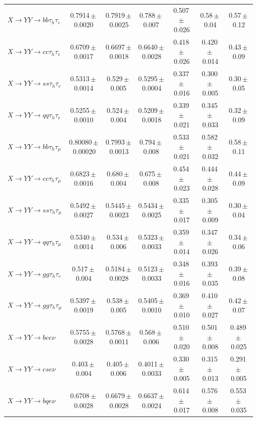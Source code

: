 \begin{landscape}
{\begin{longtable}{@{\extracolsep{\fill}}lcccccc@{}}
$X\to YY\to bb\tau_h\tau_e$ & 0.7914\,$\pm$\,0.0020 & 0.7919\,$\pm$\,0.0025 & 0.788\,$\pm$\,0.007 & 0.507\,$\pm$\,0.026 & 0.58\,$\pm$\,0.04 & 0.57\,$\pm$\,0.12 \\
$X\to YY\to cc\tau_h\tau_e$ & 0.6709\,$\pm$\,0.0017 & 0.6697\,$\pm$\,0.0018 & 0.6640\,$\pm$\,0.0028 & 0.418\,$\pm$\,0.026 & 0.420\,$\pm$\,0.014 & 0.43\,$\pm$\,0.09 \\
$X\to YY\to ss\tau_h\tau_e$ & 0.5313\,$\pm$\,0.0014 & 0.529\,$\pm$\,0.005 & 0.5295\,$\pm$\,0.0004 & 0.337\,$\pm$\,0.016 & 0.300\,$\pm$\,0.005 & 0.30\,$\pm$\,0.05 \\
$X\to YY\to qq\tau_h\tau_e$ & 0.5255\,$\pm$\,0.0010 & 0.524\,$\pm$\,0.004 & 0.5209\,$\pm$\,0.0018 & 0.339\,$\pm$\,0.021 & 0.345\,$\pm$\,0.033 & 0.32\,$\pm$\,0.09 \\
$X\to YY\to bb\tau_h\tau_\mu$ & 0.80080\,$\pm$\,0.00020 & 0.7993\,$\pm$\,0.0013 & 0.794\,$\pm$\,0.008 & 0.533\,$\pm$\,0.021 & 0.582\,$\pm$\,0.032 & 0.58\,$\pm$\,0.11 \\
$X\to YY\to cc\tau_h\tau_\mu$ & 0.6823\,$\pm$\,0.0016 & 0.680\,$\pm$\,0.004 & 0.675\,$\pm$\,0.008 & 0.454\,$\pm$\,0.023 & 0.444\,$\pm$\,0.028 & 0.44\,$\pm$\,0.09 \\
$X\to YY\to ss\tau_h\tau_\mu$ & 0.5492\,$\pm$\,0.0027 & 0.5445\,$\pm$\,0.0023 & 0.5434\,$\pm$\,0.0025 & 0.335\,$\pm$\,0.017 & 0.305\,$\pm$\,0.009 & 0.30\,$\pm$\,0.04 \\
$X\to YY\to qq\tau_h\tau_\mu$ & 0.5340\,$\pm$\,0.0014 & 0.534\,$\pm$\,0.006 & 0.5323\,$\pm$\,0.0033 & 0.359\,$\pm$\,0.014 & 0.347\,$\pm$\,0.026 & 0.34\,$\pm$\,0.06 \\
$X\to YY\to gg\tau_h\tau_e$ & 0.517\,$\pm$\,0.004 & 0.5184\,$\pm$\,0.0028 & 0.5123\,$\pm$\,0.0033 & 0.348\,$\pm$\,0.016 & 0.393\,$\pm$\,0.035 & 0.39\,$\pm$\,0.08 \\
$X\to YY\to gg\tau_h\tau_\mu$ & 0.5397\,$\pm$\,0.0019 & 0.538\,$\pm$\,0.005 & 0.5405\,$\pm$\,0.0010 & 0.369\,$\pm$\,0.010 & 0.410\,$\pm$\,0.027 & 0.42\,$\pm$\,0.07 \\
\midrule
$X\to YY\to bce\nu$ & 0.5755\,$\pm$\,0.0028 & 0.5768\,$\pm$\,0.0011 & 0.568\,$\pm$\,0.006 & 0.510\,$\pm$\,0.020 & 0.501\,$\pm$\,0.008 & 0.489\,$\pm$\,0.025 \\
$X\to YY\to cse\nu$ & 0.403\,$\pm$\,0.004 & 0.405\,$\pm$\,0.006 & 0.4011\,$\pm$\,0.0033 & 0.330\,$\pm$\,0.005 & 0.315\,$\pm$\,0.013 & 0.291\,$\pm$\,0.005 \\
$X\to YY\to bqe\nu$ & 0.6708\,$\pm$\,0.0028 & 0.6679\,$\pm$\,0.0028 & 0.6637\,$\pm$\,0.0024 & 0.614\,$\pm$\,0.017 & 0.576\,$\pm$\,0.008 & 0.553\,$\pm$\,0.035 \\

\end{longtable}}
\end{landscape}
